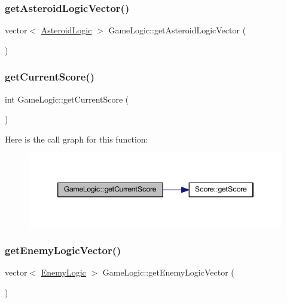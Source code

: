 \subsubsection{\texorpdfstring{get\+Asteroid\+Logic\+Vector()}{getAsteroidLogicVector()}}
{\footnotesize\ttfamily vector$<$ \hyperlink{class_asteroid_logic}{Asteroid\+Logic} $>$ Game\+Logic\+::get\+Asteroid\+Logic\+Vector (\begin{DoxyParamCaption}{ }\end{DoxyParamCaption})}

\mbox{\label{class_game_logic_a56e4499d60c8784c3bf34ab91a75e273}} 
\subsubsection{\texorpdfstring{get\+Current\+Score()}{getCurrentScore()}}
{\footnotesize\ttfamily int Game\+Logic\+::get\+Current\+Score (\begin{DoxyParamCaption}{ }\end{DoxyParamCaption})}

Here is the call graph for this function\+:\nopagebreak
\begin{figure}[H]
\begin{center}
\leavevmode
\includegraphics[width=346pt]{class_game_logic_a56e4499d60c8784c3bf34ab91a75e273_cgraph}
\end{center}
\end{figure}
\mbox{\label{class_game_logic_afa1fd0270df0970723f3aef06431e2d8}} 
\subsubsection{\texorpdfstring{get\+Enemy\+Logic\+Vector()}{getEnemyLogicVector()}}
{\footnotesize\ttfamily vector$<$ \hyperlink{class_enemy_logic}{Enemy\+Logic} $>$ Game\+Logic\+::get\+Enemy\+Logic\+Vector (\begin{DoxyParamCaption}{ }\end{DoxyParamCaption})}

